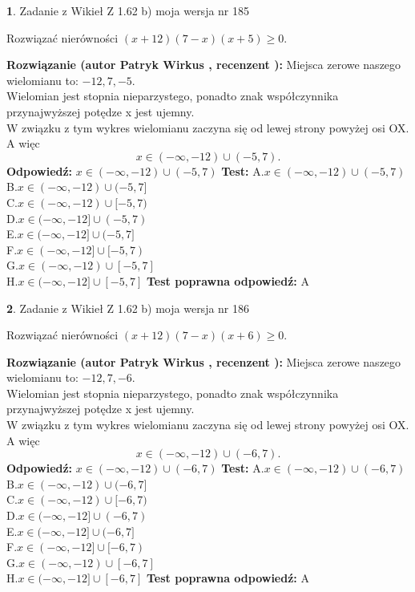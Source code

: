 \documentclass[12pt, a4paper]{article}
\theoremstyle{definition} %
\newtheorem{zad}{}
\newcommand{\zadStart}[1]{\begin{zad}#1\newline}
\newcommand{\zadStop}{\end{zad}}
\newcommand{\rozwStart}[2]{\noindent \textbf{Rozwiązanie (autor #1 , recenzent #2): }\newline}
\newcommand{\rozwStop}{\newline}
\newcommand{\odpStart}{\noindent \textbf{Odpowiedź:}\newline}
\newcommand{\odpStop}{\newline}
\newcommand{\testStart}{\noindent \textbf{Test:}\newline}
\newcommand{\testStop}{\newline}
\newcommand{\kluczStart}{\noindent \textbf{Test poprawna odpowiedź:}\newline}
\newcommand{\kluczStop}{\newline}
\begin{document}
\zadStart{Zadanie z Wikieł Z 1.62 b) moja wersja nr 185}

Rozwiązać nierówności $(x+12)(7-x)(x+5)\ge0$.
\zadStop
\rozwStart{Patryk Wirkus}{}
Miejsca zerowe naszego wielomianu to: $-12, 7, -5$.\\
Wielomian jest stopnia nieparzystego, ponadto znak współczynnika przy\linebreak najwyższej potędze x jest ujemny.\\ W związku z tym wykres wielomianu zaczyna się od lewej strony powyżej osi OX. A więc $$x \in (-\infty,-12) \cup (-5,7).$$
\rozwStop
\odpStart
$x \in (-\infty,-12) \cup (-5,7)$
\odpStop
\testStart
A.$x \in (-\infty,-12) \cup (-5,7)$\\
B.$x \in (-\infty,-12) \cup (-5,7]$\\
C.$x \in (-\infty,-12) \cup [-5,7)$\\
D.$x \in (-\infty,-12] \cup (-5,7)$\\
E.$x \in (-\infty,-12] \cup (-5,7]$\\
F.$x \in (-\infty,-12] \cup [-5,7)$\\
G.$x \in (-\infty,-12) \cup [-5,7]$\\
H.$x \in (-\infty,-12] \cup [-5,7]$
\testStop
\kluczStart
A
\kluczStop



\zadStart{Zadanie z Wikieł Z 1.62 b) moja wersja nr 186}

Rozwiązać nierówności $(x+12)(7-x)(x+6)\ge0$.
\zadStop
\rozwStart{Patryk Wirkus}{}
Miejsca zerowe naszego wielomianu to: $-12, 7, -6$.\\
Wielomian jest stopnia nieparzystego, ponadto znak współczynnika przy\linebreak najwyższej potędze x jest ujemny.\\ W związku z tym wykres wielomianu zaczyna się od lewej strony powyżej osi OX. A więc $$x \in (-\infty,-12) \cup (-6,7).$$
\rozwStop
\odpStart
$x \in (-\infty,-12) \cup (-6,7)$
\odpStop
\testStart
A.$x \in (-\infty,-12) \cup (-6,7)$\\
B.$x \in (-\infty,-12) \cup (-6,7]$\\
C.$x \in (-\infty,-12) \cup [-6,7)$\\
D.$x \in (-\infty,-12] \cup (-6,7)$\\
E.$x \in (-\infty,-12] \cup (-6,7]$\\
F.$x \in (-\infty,-12] \cup [-6,7)$\\
G.$x \in (-\infty,-12) \cup [-6,7]$\\
H.$x \in (-\infty,-12] \cup [-6,7]$
\testStop
\kluczStart
A
\kluczStop
\end{document}
